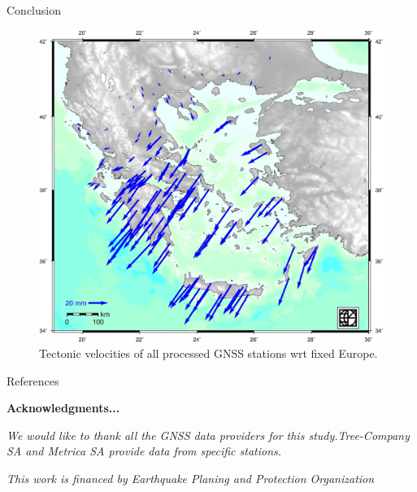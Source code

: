 \documentclass[final,a0,portrait]{beamer}
\newlength{\onecolwid}
\begin{document}
\begin{frame}[t]
\begin{columns}[t]
\begin{column}{\onecolwid}
\begin{block}{Conclusion}
{}
\begin{figure}
    \includegraphics[width=.9\onecolwid]{testvel.jpg}
    \caption{Tectonic velocities of all processed GNSS stations wrt fixed Europe.}
    \label{fig:vels}
\end{figure}
\end{block}


\begin{block}{References}

\nocite{*} %
\footnotesize{
\vspace{0.75in}}

\textbf{Acknowledgments...}
\par\textit{\footnotesize We would like to thank all the GNSS data providers for this study.Tree-Company SA and Metrica SA provide data from specific stations.}
\par\textit{\footnotesize This work is financed by Earthquake Planing and Protection Organization}
\end{block}



\end{column}
\end{columns}
\end{frame}
\end{document}
